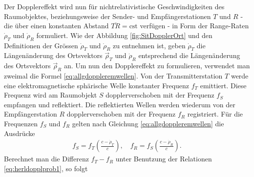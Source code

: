 \documentclass[a4paper,12pt]{article}
\numberwithin{equation}{section}
\begin{document}
Der Dopplereffekt wird nun für nichtrelativistische Geschwindigkeiten des Raumobjektes, beziehungsweise der Sender- und Empfängerstationen $T$ und $R$ - die über einen konstanten Abstand $\overline{TR}=\text{cst}$ verfügen - in Form der Range-Raten $\dot{\rho}_T$ und $\dot{\rho}_R$ formuliert. Wie der Abbildung \ref{fig:SitDopplerOrt} und den Definitionen der Grössen $\dot{\rho}_T$ und $\dot{\rho}_R$ zu entnehmen ist, geben $\dot{\rho}_T$ die Längenänderung des Ortsvektors $\vec{\rho}_T$ und $\dot{\rho}_R$ entsprechend die Längenänderung des Ortsvektors $\vec{\rho}_R$ an. Um nun den Dopplereffekt zu formulieren, verwendet man zweimal die Formel \eqref{eq:allgdoppleremwellen}. Von der Transmitterstation $T$ werde eine elektromagnetische sphärische Welle konstanter Frequenz $f_T$ emittiert. Diese Frequenz wird am Raumobjekt $S$ dopplerverschoben mit der Frequenz $f_S$ empfangen und reflektiert. Die reflektierten Wellen werden wiederum von der Empfängerstation $R$ dopplerverschoben mit der Frequenz $f_R$ registriert. Für die Frequenzen $f_S$ und $f_R$ gelten nach Gleichung \eqref{eq:allgdoppleremwellen} die Ausdrücke \begin{gather}\label{eq:herldopplprob1}
f_S = f_T\left(\frac{c-\dot{\rho}_T}{c}\right), \quad f_R  = f_S\left(\frac{c-\dot{\rho}_R}{c}\right).
\end{gather} Berechnet man die Differenz $f_T-f_R$ unter Benutzung der Relationen \eqref{eq:herldopplprob1}, so folgt
\end{document}
